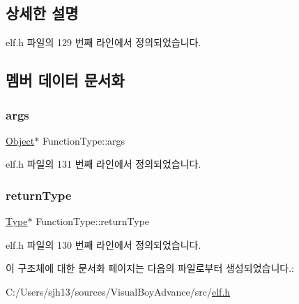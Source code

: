 \subsection{상세한 설명}


elf.\+h 파일의 129 번째 라인에서 정의되었습니다.



\subsection{멤버 데이터 문서화}
\mbox{\label{struct_function_type_ab4656e6133839aaa9b96e48949397a6a}} 
\subsubsection{\texorpdfstring{args}{args}}
{\footnotesize\ttfamily \mbox{\hyperlink{struct_object}{Object}}$\ast$ Function\+Type\+::args}



elf.\+h 파일의 131 번째 라인에서 정의되었습니다.

\mbox{\label{struct_function_type_a4512eaeaafe53ef9056acd3314263aaa}} 
\subsubsection{\texorpdfstring{return\+Type}{returnType}}
{\footnotesize\ttfamily \mbox{\hyperlink{struct_type}{Type}}$\ast$ Function\+Type\+::return\+Type}



elf.\+h 파일의 130 번째 라인에서 정의되었습니다.



이 구조체에 대한 문서화 페이지는 다음의 파일로부터 생성되었습니다.\+:\begin{DoxyCompactItemize}
\item 
C\+:/\+Users/sjh13/sources/\+Visual\+Boy\+Advance/src/\mbox{\hyperlink{elf_8h}{elf.\+h}}\end{DoxyCompactItemize}

